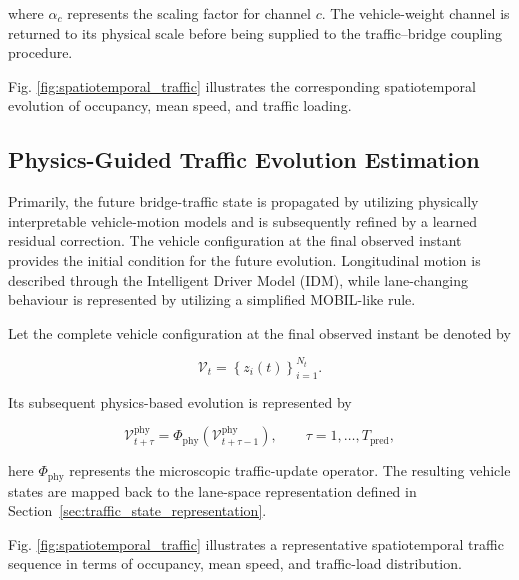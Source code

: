 \documentclass[journal]{IEEEtran}
\begin{document}
where $\alpha_c$ represents the scaling factor for channel $c$. The vehicle-weight channel is returned to its physical scale before being supplied to the traffic--bridge coupling procedure.

Fig. \ref{fig:spatiotemporal_traffic} illustrates the corresponding spatiotemporal evolution of occupancy, mean speed, and traffic loading.

\subsection{Physics-Guided Traffic Evolution Estimation}
\label{sec:physics_guided_evolution}

Primarily, the future bridge-traffic state is propagated by utilizing physically interpretable vehicle-motion models and is subsequently refined by a learned residual correction. The vehicle configuration at the final observed instant provides the initial condition for the future evolution. Longitudinal motion is described through the Intelligent Driver Model (IDM), while lane-changing behaviour is represented by utilizing a simplified MOBIL-like rule.

Let the complete vehicle configuration at the final observed instant be denoted by

\begin{equation}
\mathcal{V}_{t}
=
\left\{
z_i(t)
\right\}_{i=1}^{N_t}.
\end{equation}

Its subsequent physics-based evolution is represented by

\begin{equation}
\mathcal{V}_{t+\tau}^{\mathrm{phy}}
=
\Phi_{\mathrm{phy}}
\left(
\mathcal{V}_{t+\tau-1}^{\mathrm{phy}}
\right),
\qquad
\tau=1,\ldots,T_{\mathrm{pred}},
\end{equation}

here $\Phi_{\mathrm{phy}}$ represents the microscopic traffic-update operator. The resulting vehicle states are mapped back to the lane-space representation defined in Section~\ref{sec:traffic_state_representation}.

Fig. \ref{fig:spatiotemporal_traffic} illustrates a representative spatiotemporal traffic sequence in terms of occupancy, mean speed, and traffic-load distribution.
\end{document}
